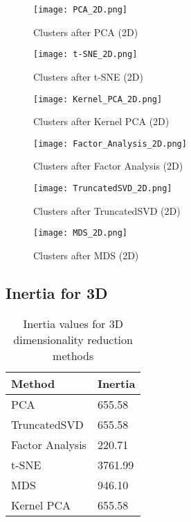 \documentclass{article}
\begin{document}
\begin{figure}[H]
    \centering
    \texttt{[image: PCA\_2D.png]}
    \caption{Clusters after PCA (2D)}
    \label{fig:pca_2d}
\end{figure}

\begin{figure}[H]
    \centering
    \texttt{[image: t-SNE\_2D.png]}
    \caption{Clusters after t-SNE (2D)}
    \label{fig:tsne_2d}
\end{figure}

\begin{figure}[H]
    \centering
    \texttt{[image: Kernel\_PCA\_2D.png]}
    \caption{Clusters after Kernel PCA (2D)}
    \label{fig:kernel_pca_2d}
\end{figure}

\begin{figure}[H]
    \centering
    \texttt{[image: Factor\_Analysis\_2D.png]}
    \caption{Clusters after Factor Analysis (2D)}
    \label{fig:factor_analysis_2d}
\end{figure}

\begin{figure}[H]
    \centering
    \texttt{[image: TruncatedSVD\_2D.png]}
    \caption{Clusters after TruncatedSVD (2D)}
    \label{fig:truncated_svd_2d}
\end{figure}

\begin{figure}[H]
    \centering
    \texttt{[image: MDS\_2D.png]}
    \caption{Clusters after MDS (2D)}
    \label{fig:mds_2d}
\end{figure}

\subsection{Inertia for 3D}

\begin{table}[H]
    \centering
    \begin{tabular}{|l|l|}
    \hline
    \textbf{Method} & \textbf{Inertia} \\ \hline
    PCA & 655.58 \\ \hline
    TruncatedSVD & 655.58 \\ \hline
    Factor Analysis & 220.71 \\ \hline
    t-SNE & 3761.99 \\ \hline
    MDS & 946.10 \\ \hline
    Kernel PCA & 655.58 \\ \hline
    \end{tabular}
    \caption{Inertia values for 3D dimensionality reduction methods}
    \label{tab:inertia_3d}
\end{table}
\end{document}
